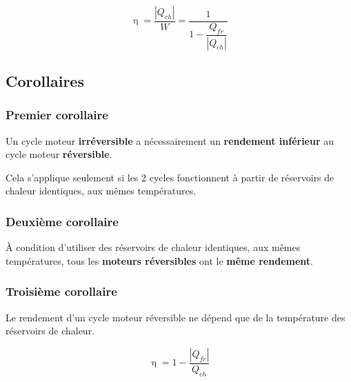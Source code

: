 \documentclass[]{article}
\begin{document}
$$ \upeta = \dfrac{|Q_{ch}|}{W} = \dfrac{1}{ 1 - \dfrac{Q_{fr}}{ |Q_{ch}| } } $$



\subsection{Corollaires}\label{corollaires}

\subsubsection{Premier corollaire}

Un cycle moteur \textbf{irréversible} a nécessairement un \textbf{rendement inférieur} au cycle moteur \textbf{réversible}.

Cela s’applique seulement si les 2 cycles fonctionnent à partir de réservoirs de chaleur identiques, aux mêmes températures.


\subsubsection{Deuxième corollaire}

À condition d’utiliser des réservoirs de chaleur identiques, aux mêmes températures, tous les \textbf{moteurs réversibles} ont le \textbf{même rendement}.


\subsubsection{Troisième corollaire}

Le rendement d’un cycle moteur réversible ne dépend que de la température des réservoirs de chaleur.

$$ \upeta = 1 - \dfrac{|Q_{fr}|}{Q_{ch}} $$
\end{document}
